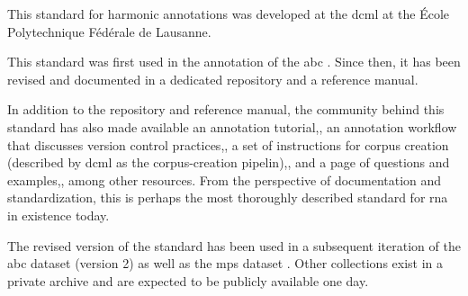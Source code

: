 

This standard for harmonic annotations was developed at the
\gls{dcml} at the \'Ecole Polytechnique F\'ed\'erale de
Lausanne.

This standard was first used in the annotation of the
\gls{abc}
\parencite{neuwirth2018annotated}. Since then, it has been
revised and documented in a dedicated
repository
and a reference
manual.

In addition to the repository and reference manual, the
community behind this standard has also made available an
annotation
tutorial,,
an annotation workflow that discusses version control
practices,,
a set of instructions for corpus creation (described by
\gls{dcml} as the corpus-creation
pipelin),,
and a page of questions and
examples,,
among other resources. From the perspective of documentation
and standardization, this is perhaps the most thoroughly
described standard for \gls{rna} in existence today.

The revised version of the standard has been used in a
subsequent iteration of the \gls{abc} dataset (version 2) as
well as the \gls{mps} dataset
\parencite{hentschel2021annotated}. Other collections exist
in a private archive and are expected to be publicly
available one day.
